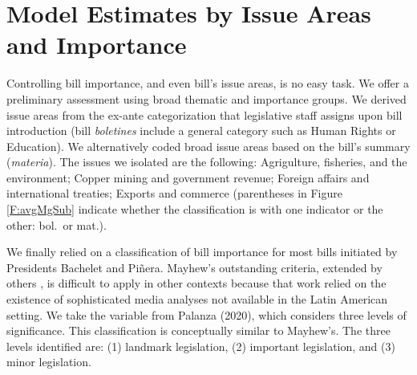 \documentclass[letter,12pt]{article}
\begin{document}

  
\section{Model Estimates by Issue Areas and Importance}

Controlling bill importance, and even bill's issue areas, is no easy task. We offer a preliminary assessment using broad thematic and importance groups. We derived issue areas from the ex-ante categorization that legislative staff assigns upon bill introduction (bill \emph{boletines} include a general category such as Human Rights or Education). We alternatively coded broad issue areas based on the bill's summary (\emph{materia}). The issues we isolated are the following: Agrigulture, fisheries, and the environment; Copper mining and government revenue; Foreign affairs and international treaties; Exports and commerce (parentheses in Figure \ref{F:avgMgSub} indicate whether the classification is with one indicator or the other: bol.\ or mat.). 

We finally relied on a classification of bill importance for most bills initiated by Presidents Bachelet and Piñera. Mayhew's \citeyearpar{mayhew.1991} outstanding criteria, extended by others \citep[e.g.,]{cameron.2000,clinton.lapinski.2006}, is difficult to apply in other contexts because that work relied on the existence of sophisticated media analyses not available in the Latin American setting. We take the variable from Palanza (2020), which considers three levels of significance. This classification is conceptually similar to Mayhew's. The three levels identified are: (1) landmark legislation, (2) important legislation, and (3) minor legislation. 
\end{document}
